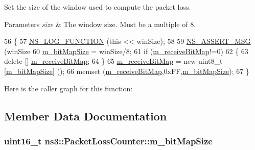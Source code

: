 Set the size of the window used to compute the packet loss. 


\begin{DoxyParams}{Parameters}
{\em size} & The window size. Must be a multiple of 8. \\
\hline
\end{DoxyParams}

\begin{DoxyCode}
56 \{
57   \hyperlink{log-macros-disabled_8h_a90b90d5bad1f39cb1b64923ea94c0761}{NS\_LOG\_FUNCTION} (\textcolor{keyword}{this} << winSize);
58 
59   \hyperlink{assert_8h_aff5ece9066c74e681e74999856f08539}{NS\_ASSERT\_MSG} (winSize%
60   \hyperlink{classns3_1_1PacketLossCounter_afb7f1479593f5ffe9352772e8a37dfa1}{m\_bitMapSize} = winSize/8;
61   \textcolor{keywordflow}{if} (\hyperlink{classns3_1_1PacketLossCounter_aaef80a448508d9395f6d9663ef2cf301}{m\_receiveBitMap}!=0)
62     \{
63       \textcolor{keyword}{delete} [] \hyperlink{classns3_1_1PacketLossCounter_aaef80a448508d9395f6d9663ef2cf301}{m\_receiveBitMap};
64     \}
65   \hyperlink{classns3_1_1PacketLossCounter_aaef80a448508d9395f6d9663ef2cf301}{m\_receiveBitMap} = \textcolor{keyword}{new} uint8\_t [\hyperlink{classns3_1_1PacketLossCounter_afb7f1479593f5ffe9352772e8a37dfa1}{m\_bitMapSize}] ();
66   memset (\hyperlink{classns3_1_1PacketLossCounter_aaef80a448508d9395f6d9663ef2cf301}{m\_receiveBitMap},0xFF,\hyperlink{classns3_1_1PacketLossCounter_afb7f1479593f5ffe9352772e8a37dfa1}{m\_bitMapSize});
67 \}
\end{DoxyCode}


Here is the caller graph for this function\+:




\subsection{Member Data Documentation}
\subsubsection[{\texorpdfstring{m\+\_\+bit\+Map\+Size}{m_bitMapSize}}]{\setlength{\rightskip}{0pt plus 5cm}uint16\+\_\+t ns3\+::\+Packet\+Loss\+Counter\+::m\+\_\+bit\+Map\+Size\hspace{0.3cm}{\ttfamily [private]}}\hypertarget{classns3_1_1PacketLossCounter_afb7f1479593f5ffe9352772e8a37dfa1}{}\label{classns3_1_1PacketLossCounter_afb7f1479593f5ffe9352772e8a37dfa1}


